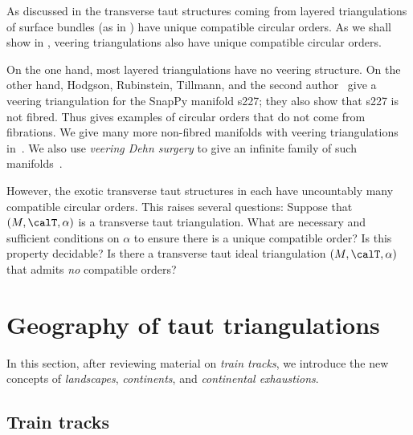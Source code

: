 \documentclass[12pt]{amsart}
\begin{document}
\begin{question}
\label{Que:RigidVersusNotSo}
As discussed in  the transverse taut structures coming from layered triangulations of surface bundles (as in ) have unique compatible circular orders.  As we shall show in , veering triangulations also have unique compatible circular orders.  

On the one hand, most layered triangulations have no veering structure.  On the other hand, Hodgson, Rubinstein, Tillmann, and the second author~\cite[Section~4]{HRST11} give a veering triangulation for the SnapPy manifold s227; they also show that s227 is not fibred.  Thus  gives examples of circular orders that do not come from fibrations.  We give many more non-fibred manifolds with veering triangulations in~\cite[\texttt{veering\_census\_with\_data.txt}]{GSS19}.  We also use \emph{veering Dehn surgery} to give an infinite family of such manifolds~\cite{veering_dehn_surgery}. 

However, the exotic transverse taut structures in  each have uncountably many compatible circular orders.  This raises several questions:  Suppose that $(M, \calT, \alpha)$ is a transverse taut triangulation.  What are necessary and sufficient conditions on $\alpha$ to ensure there is a unique compatible order?  Is this property decidable?  Is there a transverse taut ideal triangulation $(M, \calT, \alpha)$ that admits \emph{no} compatible orders?
\end{question}

\section{Geography of taut triangulations}
\label{Sec:Geography}

In this section, after reviewing material on \emph{train tracks}, we introduce the new concepts of \emph{landscapes}, \emph{continents}, and \emph{continental exhaustions}. 
 
\subsection{Train tracks}
\label{Sec:TrainTracks}
\end{document}
